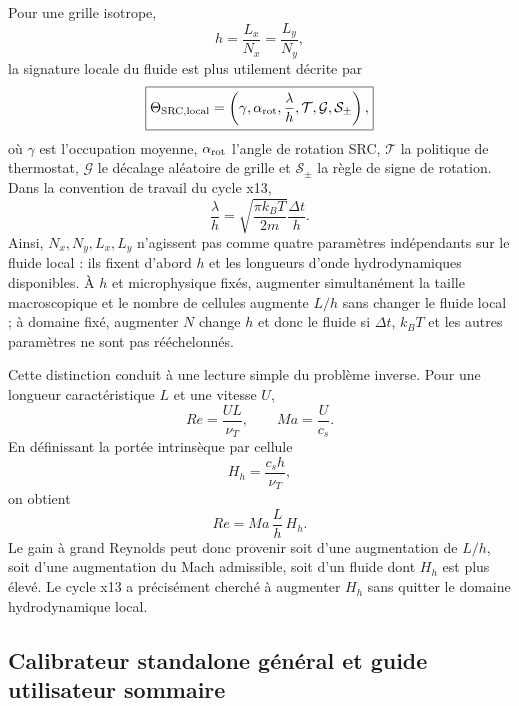 \documentclass[11pt,a4paper]{article}
\begin{document}
Pour une grille isotrope,
\begin{equation}
  h=\frac{L_x}{N_x}=\frac{L_y}{N_y},
\end{equation}
la signature locale du fluide est plus utilement décrite par
\begin{equation}
  \boxed{
  \Theta_{\rm SRC,local}
  =
  \left(
  \gamma,\alpha_{\rm rot},\frac{\lambda}{h},
  \mathcal T,\mathcal G,\mathcal S_\pm
  \right),
  }
  \label{eq:x13-local-signature}
\end{equation}
où $\gamma$ est l'occupation moyenne, $\alpha_{\rm rot}$ l'angle de rotation SRC, $\mathcal T$ la politique de thermostat, $\mathcal G$ le décalage aléatoire de grille et $\mathcal S_\pm$ la règle de signe de rotation. Dans la convention de travail du cycle x13,
\begin{equation}
  \frac{\lambda}{h}
  =
  \sqrt{\frac{\pi k_BT}{2m}}\frac{\Delta t}{h}.
  \label{eq:x13-lambda}
\end{equation}
Ainsi, $N_x,N_y,L_x,L_y$ n'agissent pas comme quatre paramètres indépendants sur le fluide local : ils fixent d'abord $h$ et les longueurs d'onde hydrodynamiques disponibles. À $h$ et microphysique fixés, augmenter simultanément la taille macroscopique et le nombre de cellules augmente $L/h$ sans changer le fluide local ; à domaine fixé, augmenter $N$ change $h$ et donc le fluide si $\Delta t$, $k_BT$ et les autres paramètres ne sont pas rééchelonnés.

Cette distinction conduit à une lecture simple du problème inverse. Pour une longueur caractéristique $L$ et une vitesse $U$,
\begin{equation}
  Re=\frac{UL}{\nu_T},
  \qquad
  Ma=\frac{U}{c_s}.
\end{equation}
En définissant la portée intrinsèque par cellule
\begin{equation}
  H_h=\frac{c_s h}{\nu_T},
  \label{eq:x13-Hh}
\end{equation}
on obtient
\begin{equation}
  \boxed{
  Re=Ma\,\frac{L}{h}\,H_h.
  }
  \label{eq:x13-Re-Ma-Hh}
\end{equation}
Le gain à grand Reynolds peut donc provenir soit d'une augmentation de $L/h$, soit d'une augmentation du Mach admissible, soit d'un fluide dont $H_h$ est plus élevé. Le cycle x13 a précisément cherché à augmenter $H_h$ sans quitter le domaine hydrodynamique local.

\subsection{Calibrateur standalone général et guide utilisateur sommaire}
\label{sec:x13-standalone-calibrator}
\end{document}

